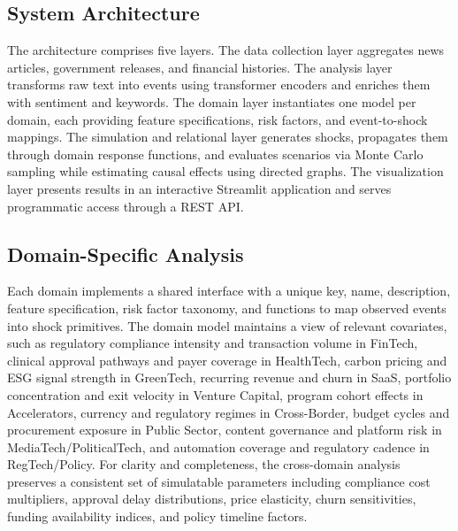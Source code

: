 \documentclass[conference]{IEEEtran}
\begin{document}
\subsection{System Architecture}
The architecture comprises five layers. The data collection layer aggregates news articles, government releases, and financial histories. The analysis layer transforms raw text into events using transformer encoders and enriches them with sentiment and keywords. The domain layer instantiates one model per domain, each providing feature specifications, risk factors, and event-to-shock mappings. The simulation and relational layer generates shocks, propagates them through domain response functions, and evaluates scenarios via Monte Carlo sampling while estimating causal effects using directed graphs. The visualization layer presents results in an interactive Streamlit application and serves programmatic access through a REST API.

\subsection{Domain-Specific Analysis}
Each domain implements a shared interface with a unique key, name, description, feature specification, risk factor taxonomy, and functions to map observed events into shock primitives. The domain model maintains a view of relevant covariates, such as regulatory compliance intensity and transaction volume in FinTech, clinical approval pathways and payer coverage in HealthTech, carbon pricing and ESG signal strength in GreenTech, recurring revenue and churn in SaaS, portfolio concentration and exit velocity in Venture Capital, program cohort effects in Accelerators, currency and regulatory regimes in Cross-Border, budget cycles and procurement exposure in Public Sector, content governance and platform risk in MediaTech/PoliticalTech, and automation coverage and regulatory cadence in RegTech/Policy. For clarity and completeness, the cross-domain analysis preserves a consistent set of simulatable parameters including compliance cost multipliers, approval delay distributions, price elasticity, churn sensitivities, funding availability indices, and policy timeline factors.
\end{document}
